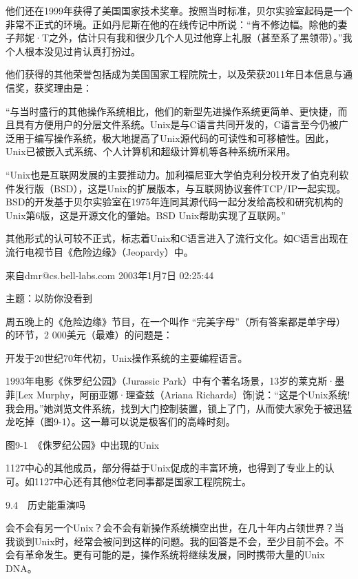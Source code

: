 \documentclass[a4paper,12pt,UTF8,twoside]{ctexbook}
\begin{document}
他们还在1999年获得了美国国家技术奖章。按照当时标准，贝尔实验室起码是一个非常不正式的环境。正如丹尼斯在他的在线传记中所说：“肯不修边幅。除他的妻子邦妮·T之外，估计只有我和很少几个人见过他穿上礼服（甚至系了黑领带）。”我个人根本没见过肯认真打扮过。

他们获得的其他荣誉包括成为美国国家工程院院士，以及荣获2011年日本信息与通信奖，获奖理由是：

“与当时盛行的其他操作系统相比，他们的新型先进操作系统更简单、更快捷，而且具有方便用户的分层文件系统。Unix是与C语言共同开发的，C语言至今仍被广泛用于编写操作系统，极大地提高了Unix源代码的可读性和可移植性。因此，Unix已被嵌入式系统、个人计算机和超级计算机等各种系统所采用。

“Unix也是互联网发展的主要推动力。加利福尼亚大学伯克利分校开发了伯克利软件发行版（BSD），这是Unix的扩展版本，与互联网协议套件TCP/IP一起实现。BSD的开发基于贝尔实验室在1975年连同其源代码一起分发给高校和研究机构的Unix第6版，这是开源文化的肇始。BSD Unix帮助实现了互联网。”



其他形式的认可较不正式，标志着Unix和C语言进入了流行文化。如C语言出现在流行电视节目《危险边缘》（Jeopardy）中。



来自dmr@cs.bell-labs.com 2003年1月7日 02:25:44

主题：以防你没看到

周五晚上的《危险边缘》节目，在一个叫作 “完美字母”（所有答案都是单字母）的环节，2 000美元（最难）的问题是：

开发于20世纪70年代初，Unix操作系统的主要编程语言。



1993年电影《侏罗纪公园》（Jurassic Park）中有个著名场景，13岁的莱克斯·墨菲[Lex Murphy，阿丽亚娜·理查兹（Ariana Richards）饰]说：“这是个Unix系统! 我会用。”她浏览文件系统，找到大门控制装置，锁上了门，从而使大家免于被迅猛龙吃掉（图9-1）。这一幕可以说是极客们的高峰时刻。



图9-1　《侏罗纪公园》中出现的Unix

1127中心的其他成员，部分得益于Unix促成的丰富环境，也得到了专业上的认可。如1127中心还有其他8位老同事都是国家工程院院士。





9.4　历史能重演吗


会不会有另一个Unix？会不会有新操作系统横空出世，在几十年内占领世界？当我谈到Unix时，经常会被问到这样的问题。我的回答是不会，至少目前不会。不会有革命发生。更有可能的是，操作系统将继续发展，同时携带大量的Unix DNA。
\end{document}
